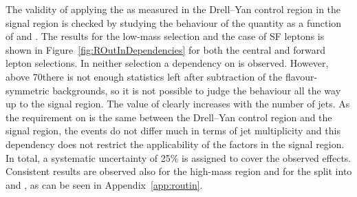 
The validity of applying the \Routin as measured in the Drell--Yan control region in the signal region is checked by studying the behaviour of the quantity as a function of \MET and \njets. The results for the low-mass selection and the case of SF leptons is shown in Figure~\ref{fig:ROutInDependencies} for both the central and forward lepton selections. In neither selection a dependency on \MET is observed. However, above 70\GeV there is not enough statistics left after subtraction of the flavour-symmetric backgrounds, so it is not possible to judge the behaviour all the way up to the signal region. The value of \Routin clearly increases with the number of jets. As the requirement on \njets is the same between the Drell--Yan control region and the signal region, the events do not differ much in terms of jet multiplicity and this dependency does not restrict the applicability of the \Routin factors in the signal region. In total, a systematic uncertainty of 25\% is assigned to cover the observed effects. Consistent results are observed also for the high-mass region and for the split into \EE and \MM, as can be seen in Appendix~\ref{app:routin}.

